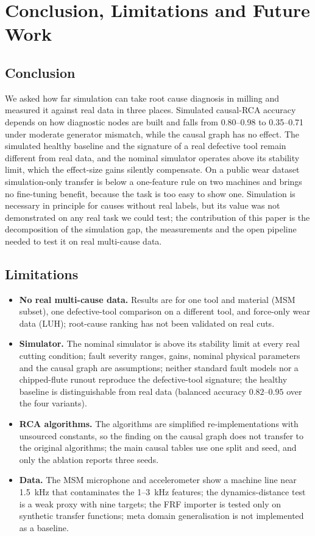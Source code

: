 \documentclass[11pt]{article}
\begin{document}
\section{Conclusion, Limitations and Future Work}\label{sec:concl}
\subsection{Conclusion}
We asked how far simulation can take root cause diagnosis in milling and measured it against real data in three places.
Simulated causal-RCA accuracy depends on how diagnostic nodes are built and falls from 0.80--0.98 to 0.35--0.71 under moderate generator mismatch, while the causal graph has no effect.
The simulated healthy baseline and the signature of a real defective tool remain different from real data, and the nominal simulator operates above its stability limit, which the effect-size gains silently compensate.
On a public wear dataset simulation-only transfer is below a one-feature rule on two machines and brings no fine-tuning benefit, because the task is too easy to show one.
Simulation is necessary in principle for causes without real labels, but its value was not demonstrated on any real task we could test; the contribution of this paper is the decomposition of the simulation gap, the measurements and the open pipeline needed to test it on real multi-cause data.

\subsection{Limitations}\label{sec:limits}
\begin{itemize}
\item \textbf{No real multi-cause data.} Results are for one tool and material (MSM subset), one defective-tool comparison on a different tool, and force-only wear data (LUH); root-cause ranking has not been validated on real cuts.
\item \textbf{Simulator.} The nominal simulator is above its stability limit at every real cutting condition; fault severity ranges, gains, nominal physical parameters and the causal graph are assumptions; neither standard fault models nor a chipped-flute runout reproduce the defective-tool signature; the healthy baseline is distinguishable from real data (balanced accuracy $0.82$--$0.95$ over the four variants).
\item \textbf{RCA algorithms.} The algorithms are simplified re-implementations with unsourced constants, so the finding on the causal graph does not transfer to the original algorithms; the main causal tables use one split and seed, and only the ablation reports three seeds.
\item \textbf{Data.} The MSM microphone and accelerometer show a machine line near 1.5~kHz that contaminates the 1--3~kHz features; the dynamics-distance test is a weak proxy with nine targets; the FRF importer is tested only on synthetic transfer functions; meta domain generalisation is not implemented as a baseline.
\end{itemize}
\end{document}
